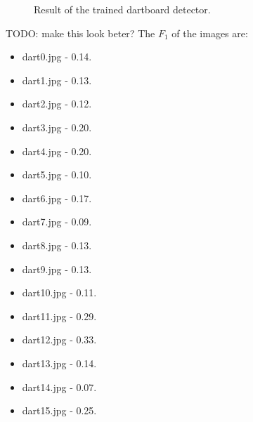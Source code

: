 \documentclass[a4paper]{article}
\begin{document}
\begin{figure}[H]
  \centering
  \hfill
   \hfill
   \hfill
   \hfill
   \caption{Result of the trained dartboard detector.}
\end{figure}

TODO: make this look beter?\newline
The \(F_{1}\) of the images are:
\begin{multicols}{4}
    \begin{itemize}
		\item dart0.jpg - 0.14.
        \item dart1.jpg - 0.13.
        \item dart2.jpg - 0.12.
        \item dart3.jpg - 0.20.
        \item dart4.jpg - 0.20.
        \item dart5.jpg - 0.10.
        \item dart6.jpg - 0.17.
        \item dart7.jpg - 0.09.
        \item dart8.jpg - 0.13.
        \item dart9.jpg - 0.13.
        \item dart10.jpg - 0.11.
        \item dart11.jpg - 0.29.
        \item dart12.jpg - 0.33.
        \item dart13.jpg - 0.14.
        \item dart14.jpg - 0.07.
        \item dart15.jpg - 0.25.
    \end{itemize}
\end{multicols}
\end{document}
